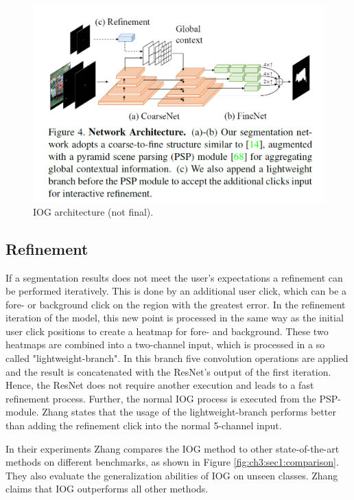 \begin{figure}
	\includegraphics[width=\linewidth]{figures/chap31_arch.png}
	\caption{IOG architecture (not final).}
	\label{fig:ch3:sec1:arch}
\end{figure}

\subsection{Refinement}\label{ord:ch3:sec1:subsec3}
If a segmentation results does not meet the user's expectations a refinement can be performed iteratively. 
This is done by an additional user click, which can be a fore- or background click on the region with the greatest error. 
In the refinement iteration of the model, this new point is processed in the same way as the initial user click positions to create a heatmap for fore- and background.
These two heatmaps are combined into a two-channel input, which is processed in a so called "lightweight-branch". 
In this branch five convolution operations are applied and the result is concatenated with the ResNet's output of the first iteration.
Hence, the ResNet does not require another execution and leads to a fast refinement process.
Further, the normal IOG process is executed from the PSP-module. 
Zhang states that the usage of the lightweight-branch performs better than adding the refinement click into the normal 5-channel input.

In their experiments Zhang compares the IOG method to other state-of-the-art methods on different benchmarks, as shown in Figure \ref{fig:ch3:sec1:comparison}.
They also evaluate the generalization abilities of IOG on unseen classes.
Zhang claims that IOG outperforms all other methods.

